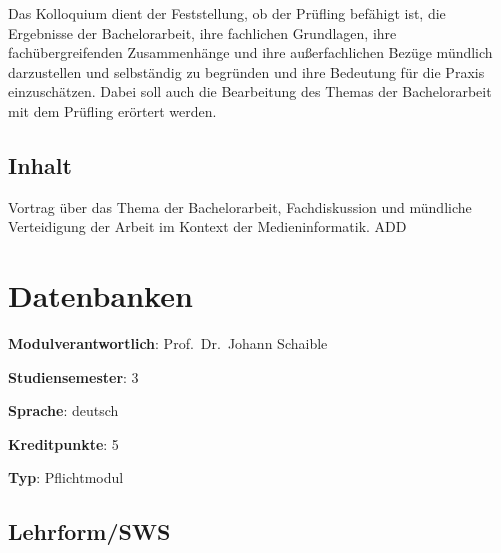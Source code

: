 Das Kolloquium dient der Feststellung, ob der Prüfling befähigt ist, die
Ergebnisse der Bachelorarbeit, ihre fachlichen Grundlagen, ihre
fachübergreifenden Zusammenhänge und ihre außerfachlichen Bezüge
mündlich darzustellen und selbständig zu begründen und ihre Bedeutung
für die Praxis einzuschätzen. Dabei soll auch die Bearbeitung des Themas
der Bachelorarbeit mit dem Prüfling erörtert werden.

\hypertarget{inhaltpathlabelmi-2017modulbeschreibungen-bachelorba_bachelorkolloquium}{%
\section*{Inhalt\label{/mi-2017/modulbeschreibungen-bachelor/BA_Bachelorkolloquium}}\label{inhaltpathlabelmi-2017modulbeschreibungen-bachelorba_bachelorkolloquium}}

Vortrag über das Thema der Bachelorarbeit, Fachdiskussion und mündliche
Verteidigung der Arbeit im Kontext der Medieninformatik. ADD

\hypertarget{datenbankenpathlabelmi-2017modulbeschreibungen-bachelorba_datenbanken1}{%
\chapter{Datenbanken\label{/mi-2017/modulbeschreibungen-bachelor/BA_Datenbanken1}}\label{datenbankenpathlabelmi-2017modulbeschreibungen-bachelorba_datenbanken1}}

\begin{modulHead}
\textbf{Modulverantwortlich}: Prof.~Dr.~Johann
Schaible
\end{modulHead}
\begin{modulHead}
\textbf{Studiensemester}:
3
\end{modulHead}
\begin{modulHead}
\textbf{Sprache}:
deutsch
\end{modulHead}
\begin{modulHead}
\textbf{Kreditpunkte}:
5
\end{modulHead}
\begin{modulHead}
\textbf{Typ}:
Pflichtmodul
\end{modulHead}


\hypertarget{lehrformswspathlabelmi-2017modulbeschreibungen-bachelorba_datenbanken1}{%
\section*{Lehrform/SWS\label{/mi-2017/modulbeschreibungen-bachelor/BA_Datenbanken1}}\label{lehrformswspathlabelmi-2017modulbeschreibungen-bachelorba_datenbanken1}}

